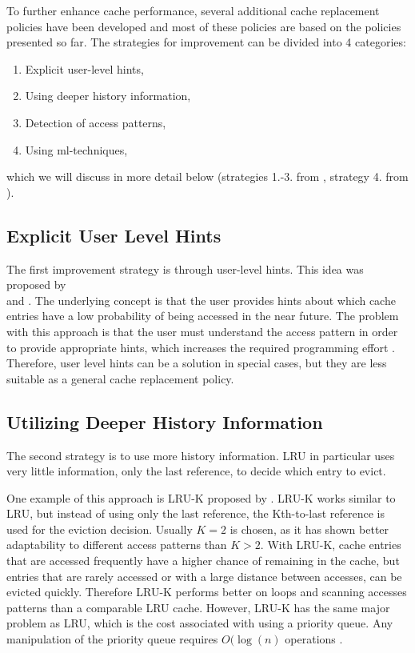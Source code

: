 \documentclass[
	12pt,
	a4paper,
	abstract,
	bibliography=totoc,
	chapterprefix,
	headings=openright,
	numbers=endperiod,
	parskip=half,
	twoside,
]{scrreprt}
\begin{document}
To further enhance cache performance, several additional cache replacement policies have been developed and
most of these policies are based on the policies presented so far.
The strategies for improvement can be divided into 4 categories:

\begin{enumerate}
	\setlength\itemsep{-0.8em}
	\item Explicit user-level hints,
	\item Using deeper history information,
	\item Detection of access patterns,
	\item Using ml-techniques,
\end{enumerate}

which we will discuss in more detail below 
(strategies 1.-3. from \cite{10.1145/511399.511340}, strategy 4. from \cite{rodriguez2021learning}).


\subsection{Explicit User Level Hints}

The first improvement strategy is through user-level hints.
This idea was proposed by \\
\cite{cao1994application} and \cite{patterson1995informed}.
The underlying concept is that the user provides hints about which cache entries have a low probability of 
being accessed in the near future.
The problem with this approach is that the user must understand the access pattern 
in order to provide appropriate hints, which increases 
the required programming effort \cite{10.1145/511399.511340}.
Therefore, user level hints can be a solution in special cases,
but they are less suitable as a general cache replacement policy.

\subsection{Utilizing Deeper History Information}

The second strategy is to use more history information.
LRU in particular uses very little information, only the last reference, to decide which entry to evict.

One example of this approach is LRU-K proposed by \cite{o1993lru}.
LRU-K works similar to LRU, but instead of using only the last reference,
the Kth-to-last reference is used for the eviction decision. 
Usually $K = 2$ is chosen, as it has shown better adaptability to different access patterns than $K > 2$.
With LRU-K, cache entries that are accessed frequently have a higher chance of remaining in the cache, but 
entries that are rarely accessed or with a large distance between accesses, can be evicted quickly.
Therefore LRU-K performs better on loops and scanning accesses patterns than a comparable LRU cache. 
However, LRU-K has the same major problem as LRU, which is the cost associated with using a priority queue.
Any manipulation of the priority queue requires $O(\log(n)$ operations \cite{10.1145/511399.511340}.
\end{document}
